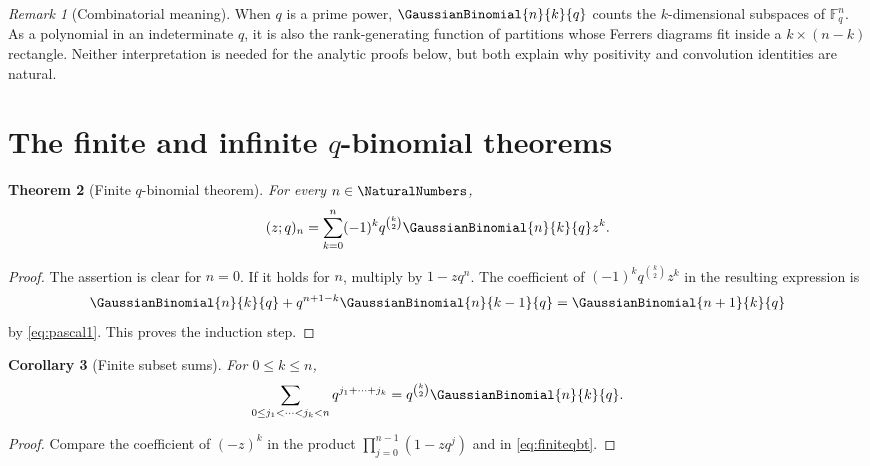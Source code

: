 \documentclass[11pt]{article}
\numberwithin{equation}{section}
\newtheorem{theorem}{Theorem}[section]
\newtheorem{corollary}[theorem]{Corollary}
\theoremstyle{definition}
\theoremstyle{remark}
\newtheorem{remark}[theorem]{Remark}
\begin{document}
\begin{remark}[Combinatorial meaning]
When $q$ is a prime power, $\GaussianBinomial{n}{k}{q}$ counts the $k$-dimensional subspaces of
$\mathbb F_q^n$.  As a polynomial in an indeterminate $q$, it is also the
rank-generating function of partitions whose Ferrers diagrams fit inside a
$k\times(n-k)$ rectangle.  Neither interpretation is needed for the analytic
proofs below, but both explain why positivity and convolution identities are
natural.
\end{remark}

\section{The finite and infinite $q$-binomial theorems}

\begin{theorem}[Finite $q$-binomial theorem]\label{thm:finiteqbt}
For every $n\in\NaturalNumbers$,
\begin{equation}\label{eq:finiteqbt}
(z;q)_n=\sum_{k=0}^n(-1)^kq^{\binom k2}\GaussianBinomial{n}{k}{q} z^k.
\end{equation}
\end{theorem}
\begin{proof}
The assertion is clear for $n=0$.  If it holds for $n$, multiply by
$1-zq^n$.  The coefficient of
$(-1)^kq^{\binom k2}z^k$ in the resulting expression is
\[
\GaussianBinomial{n}{k}{q}+q^{n+1-k}\GaussianBinomial{n}{k-1}{q}=\GaussianBinomial{n+1}{k}{q}
\]
by \eqref{eq:pascal1}.  This proves the induction step.
\end{proof}

\begin{corollary}[Finite subset sums]\label{cor:subsets}
For $0\le k\le n$,
\[
\sum_{0\le j_1<\cdots<j_k<n}q^{j_1+\cdots+j_k}
=q^{\binom k2}\GaussianBinomial{n}{k}{q}.
\]
\end{corollary}
\begin{proof}
Compare the coefficient of $(-z)^k$ in the product
$\prod_{j=0}^{n-1}(1-zq^j)$ and in \eqref{eq:finiteqbt}.
\end{proof}
\end{document}
